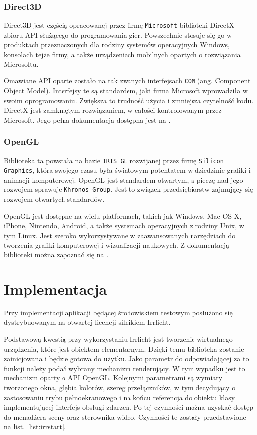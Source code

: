 \documentclass[11pt]{mwrep}
\begin{document}
      \subsubsection{Direct3D}

      Direct3D jest częścią opracowanej przez firmę \texttt{Microsoft} biblioteki DirectX -- zbioru API służącego do programowania gier. Powszechnie stosuje się go w produktach przeznaczonych dla rodziny systemów operacyjnych Windows, konsolach tejże firmy, a także urządzeniach mobilnych opartych o rozwiązania Microsoftu.
 
      Omawiane API oparte zostało na tak zwanych interfejsach \texttt{COM} (ang. Component Object Model). Interfejsy te są standardem, jaki firma Microsoft wprowadziła w swoim oprogramowaniu. Zwiększa to trudność użycia i zmniejsza czytelność kodu. DirectX jest zamkniętym rozwiązaniem,  w całości kontrolowanym przez Microsoft. Jego pełna dokumentacja dostępna jest na \cite{dx}.

      \subsubsection{OpenGL}

      Biblioteka ta powstała na bazie \texttt{IRIS GL} rozwijanej przez firmę \texttt{Silicon Graphics}, która swojego czasu była światowym potentatem w dziedzinie grafiki i animacji komputerowej. OpenGL jest standardem otwartym, a pieczę nad jego rozwojem sprawuje \texttt{Khronos Group}. Jest to związek przedsiębiorstw zajmujący się rozwojem otwartych standardów.

      OpenGL jest dostępne na wielu platformach, takich jak Windows, Mac OS X, iPhone, Nintendo, Android, a także systemach operacyjnych z rodziny Unix, w tym Linux. Jest szeroko wykorzystywane w zaawansowanych narzędziach do tworzenia grafiki komputerowej i wizualizacji naukowych. Z dokumentacją biblioteki można zapoznać się na \cite{opengl}.

  \section{Implementacja}

Przy implementacji aplikacji będącej środowiskiem testowym posłużono się dystrybuowanym na otwartej licencji silnikiem Irrlicht.

Podstawową kwestią przy wykorzystaniu Irrlicht jest tworzenie wirtualnego urządzenia, które jest obiektem elementarnym. Dzięki temu biblioteka zostanie zainicjowana i będzie gotowa do użytku. Jako parametr do odpowiadającej za to funkcji należy podać wybrany mechanizm renderujący. W tym wypadku jest to mechanizm oparty o API OpenGL. Kolejnymi parametrami są wymiary tworzonego okna, głębia kolorów, szereg przełączników, w tym decydujący o zastosowaniu trybu pełnoekranowego i na końcu referencja do obiektu klasy implementującej interfejs obsługi zdarzeń. Po tej czynności można uzyskać dostęp do menadżera sceny oraz sterownika wideo. Czynności te zostały przedstawione na list. \ref{list:irrstart}.
\end{document}
